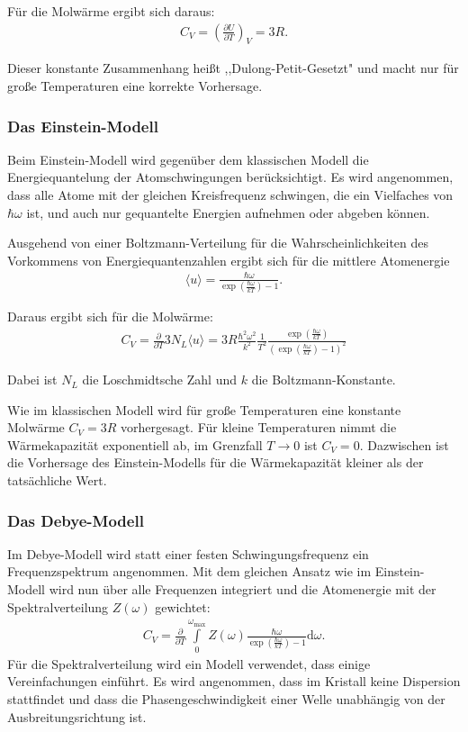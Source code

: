 Für die Molwärme ergibt sich daraus:
\begin{align}
	C_V = \left(\frac{\partial U}{\partial T}\right)_V = 3R.
\end{align}

Dieser konstante Zusammenhang heißt ,,Dulong-Petit-Gesetzt" und macht nur für große Temperaturen eine korrekte Vorhersage.

\subsubsection{Das Einstein-Modell}
Beim Einstein-Modell wird gegenüber dem klassischen Modell die Energiequantelung der Atomschwingungen berücksichtigt.
Es wird angenommen, dass alle Atome mit der gleichen Kreisfrequenz schwingen, die ein Vielfaches von $\hbar\omega$ ist, und auch nur gequantelte Energien aufnehmen oder abgeben können.

Ausgehend von einer Boltzmann-Verteilung für die Wahrscheinlichkeiten des Vorkommens von Energiequantenzahlen ergibt sich für die mittlere Atomenergie
\begin{align}
	\langle u \rangle = \frac{\hbar \omega}{\exp \left( \frac{\hbar \omega}{kT} \right)-1}.
\end{align}

Daraus ergibt sich für die Molwärme:
\begin{align}
	C_V = \frac{\partial}{\partial T} 3N_L \langle u \rangle = 3R \frac{\hbar^2 \omega^2}{k^2}\frac{1}{T^2}\frac{\exp \left(\frac{\hbar\omega}{k T}\right)}{\left(\exp\left(\frac{\hbar\omega}{k T}\right) - 1\right)^2}
\end{align}

Dabei ist $N_L$ die Loschmidtsche Zahl und $k$ die Boltzmann-Konstante.

Wie im klassischen Modell wird für große Temperaturen eine konstante Molwärme $C_V = 3R$ vorhergesagt.
Für kleine Temperaturen nimmt die Wärmekapazität exponentiell ab, im Grenzfall $T \rightarrow 0$ ist $C_V = 0$.
Dazwischen ist die Vorhersage des Einstein-Modells für die Wärmekapazität kleiner als der tatsächliche Wert.

\subsubsection{Das Debye-Modell}

Im Debye-Modell wird statt einer festen Schwingungsfrequenz ein Frequenzspektrum angenommen.
Mit dem gleichen Ansatz wie im Einstein-Modell wird nun über alle Frequenzen integriert und die Atomenergie mit der Spektralverteilung $Z(\omega)$ gewichtet:
\begin{align}
	\label{debye1}
	C_V = \frac{\partial}{\partial T} \int\limits_{0}^{\omega_\mathrm{max}} Z(\omega) \frac{\hbar \omega}{\exp \left( \frac{\hbar \omega}{kT} \right)-1} \mathrm{d}\omega.
\end{align}
Für die Spektralverteilung wird ein Modell verwendet, dass einige Vereinfachungen einführt.
Es wird angenommen, dass im Kristall keine Dispersion stattfindet und dass die Phasengeschwindigkeit einer Welle unabhängig von der Ausbreitungsrichtung ist.


